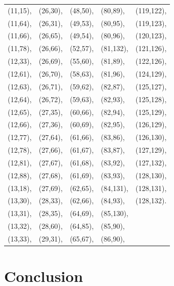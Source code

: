 \documentclass[twocolumn]{svjour3}
\begin{document}
\begin{center}
\begin{supertabular}[tb]{l l l l l}
(11,15),&(26,30),&(48,50),&(80,89),&(119,122),\\
(11,64),&(26,31),&(49,53),&(80,95),&(119,123),\\
(11,66),&(26,65),&(49,54),&(80,96),&(120,123),\\
(11,78),&(26,66),&(52,57),&(81,132),&(121,126),\\
(12,33),&(26,69),&(55,60),&(81,89),&(122,126),\\
(12,61),&(26,70),&(58,63),&(81,96),&(124,129),\\
(12,63),&(26,71),&(59,62),&(82,87),&(125,127),\\
(12,64),&(26,72),&(59,63),&(82,93),&(125,128),\\
(12,65),&(27,35),&(60,66),&(82,94),&(125,129),\\
(12,66),&(27,36),&(60,69),&(82,95),&(126,129),\\
(12,77),&(27,64),&(61,66),&(83,86),&(126,130),\\
(12,78),&(27,66),&(61,67),&(83,87),&(127,129),\\
(12,81),&(27,67),&(61,68),&(83,92),&(127,132),\\
(12,88),&(27,68),&(61,69),&(83,93),&(128,130),\\
(13,18),&(27,69),&(62,65),&(84,131),&(128,131),\\
(13,30),&(28,33),&(62,66),&(84,93),&(128,132).  \\
(13,31),&(28,35),&(64,69),&(85,130),&\\
(13,32),&(28,60),&(64,85),&(85,90),&\\
(13,33),&(29,31),&(65,67),&(86,90),&\\
\end{supertabular}
\end{center}


	\section{Conclusion}
	\label{sect:discussion}
\end{document}
